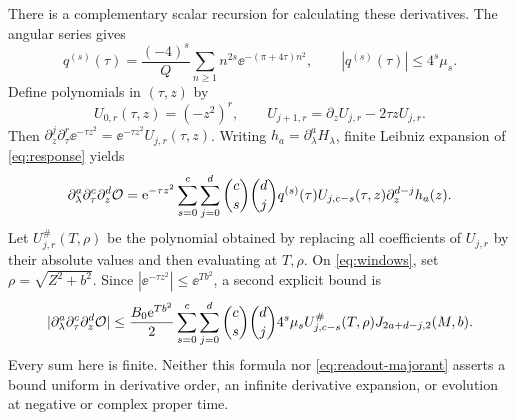 There is a complementary scalar recursion for calculating these
derivatives. The angular series gives
\begin{equation}
 q^{(s)}(\tau)=\frac{(-4)^s}{Q}
       \sum_{n\ge1}n^{2s}\ee^{-(\pi+4\tau)n^2},
 \qquad |q^{(s)}(\tau)|\le4^s\mu_s.
 \label{eq:q-derivatives}
\end{equation}
Define polynomials in $(\tau,z)$ by
\begin{equation}
 U_{0,r}(\tau,z)=(-z^2)^r,\qquad
 U_{j+1,r}=\partial_zU_{j,r}-2\tau zU_{j,r}.
 \label{eq:U-recursion}
\end{equation}
Then
$\partial_z^j\partial_\tau^r\ee^{-\tau z^2}
=\ee^{-\tau z^2}U_{j,r}(\tau,z)$.
Writing $h_a=\partial_\lambda^aH_\lambda$, finite Leibniz expansion
of \eqref{eq:response} yields
\begin{equation}
 \partial_\lambda^a\partial_\tau^c\partial_z^d\mathcal O
 =\mathrm e^{-\tau z^2}\sum_{s=0}^c\sum_{j=0}^d
   \binom cs\binom dj q^{(s)}(\tau)
   U_{j,c-s}(\tau,z)\partial_z^{d-j}h_a(z).
 \label{eq:scalar-mixed}
\end{equation}
Let $U^\#_{j,r}(T,\rho)$ be the polynomial obtained by replacing all
coefficients of $U_{j,r}$ by their absolute values and then evaluating
at $T,\rho$. On \eqref{eq:windows}, set $\rho=\sqrt{Z^2+b^2}$.
Since $|\ee^{-\tau z^2}|\le\ee^{Tb^2}$, a second explicit bound is
\begin{equation}
 |\partial_\lambda^a\partial_\tau^c\partial_z^d\mathcal O|
 \le\frac{B_0\mathrm e^{Tb^2}}2
 \sum_{s=0}^c\sum_{j=0}^d\binom cs\binom dj
 4^s\mu_s U^\#_{j,c-s}(T,\rho)J_{2a+d-j,2}(M,b).
 \label{eq:scalar-mixed-bound}
\end{equation}
Every sum here is finite. Neither this formula nor
\eqref{eq:readout-majorant} asserts a bound uniform in derivative order,
an infinite derivative expansion, or evolution at negative or complex
proper time.
